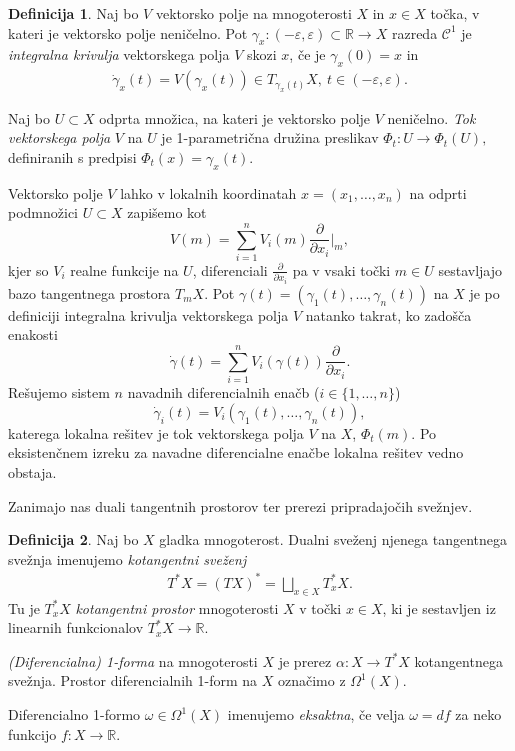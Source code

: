 \documentclass[12pt,a4paper,twoside]{article}
\theoremstyle{definition} %
\newtheorem{definicija}{Definicija}[section]
\theoremstyle{plain} %
\numberwithin{equation}{section}  %
\newcommand{\R}{\mathbb R}
\begin{document}
\begin{definicija}
Naj bo $V$ vektorsko polje na mnogoterosti $X$ in $x \in X$ točka, v kateri je vektorsko polje neničelno. Pot $\gamma_{x} \colon (-\varepsilon, \varepsilon) \subset \R \to X$ razreda $\mathcal{C}^{1}$ je \emph{integralna krivulja} vektorskega polja $V$ skozi $x$, če je $\gamma_{x}(0) = x$ in
\begin{align}
\dot{\gamma}_{x} (t) = V(\gamma _{x}(t)) \in T_{\gamma _{x}(t)}X, \ t \in (-\varepsilon, \varepsilon).
\end{align}

Naj bo $U \subset X$ odprta množica, na kateri je vektorsko polje $V$ neničelno. \emph{Tok vektorskega polja} $V$ na $U$ je 1-parametrična družina preslikav
$ \Phi_{t} \colon U \to \Phi_{t}(U),$ definiranih s predpisi $\Phi_{t}(x) = \gamma_{x}(t)$.
\end{definicija}

Vektorsko polje $V$ lahko v lokalnih koordinatah $x = (x_{1}, \dots, x_{n})$ na odprti podmnožici $U \subset X$ zapišemo kot 
\begin{equation}
V(m) = \sum_{i=1}^{n} V_{i}(m) \frac{\partial}{\partial x_{i}} \Big|_{m},
\end{equation}
kjer so $V_{i}$ realne funkcije na $U$, diferenciali $\frac{\partial}{\partial x_{i}}$ pa v vsaki točki $m \in U$ sestavljajo bazo tangentnega prostora $T_{m}X$.
Pot $\gamma (t) = (\gamma_{1}(t), \dots, \gamma_{n}(t))$ na $X$ je po definiciji integralna krivulja vektorskega polja $V$ natanko takrat, ko zadošča enakosti 
\begin{equation*}
\dot{\gamma}(t) = \sum_{i=1}^{n} V_{i}(\gamma(t)) \frac{\partial}{\partial x_{i}}.
\end{equation*}
Rešujemo sistem $n$ navadnih diferencialnih enačb ($i \in \{ 1, \dots , n \}$)
\begin{equation*}
\dot{\gamma}_{i}(t) = V_{i}(\gamma_{1}(t), \dots, \gamma_{n}(t)),
\end{equation*}
katerega lokalna rešitev je tok vektorskega polja $V$ na $X$, $\Phi_{t}(m)$. Po eksistenčnem izreku za navadne diferencialne enačbe lokalna rešitev vedno obstaja.

Zanimajo nas duali tangentnih prostorov ter prerezi pripradajočih svežnjev.

\begin{definicija}
Naj bo $X$ gladka mnogoterost. Dualni sveženj njenega tangentnega svežnja imenujemo \emph{kotangentni sveženj}
\begin{align}
T^{*}X = (TX)^{*} = \bigsqcup_{x \in X} T_{x}^{*}X.
\end{align}
Tu je $T_{x}^{*}X$ \emph{kotangentni prostor} mnogoterosti $X$ v točki $x \in X$, ki je sestavljen iz linearnih funkcionalov $T_{x}^{*}X \to \R$.

\emph{(Diferencialna) 1-forma} na mnogoterosti $X$ je prerez $\alpha \colon X \to T^{*}X$ kotangentnega svežnja. Prostor diferencialnih 1-form na $X$ označimo z $\Omega ^{1}(X)$.

Diferencialno 1-formo $\omega \in \Omega ^{1}(X)$ imenujemo \emph{eksaktna}, če velja $\omega = df$ za neko funkcijo $f \colon X \to \mathbb{R}$.
\end{definicija}
\end{document}
